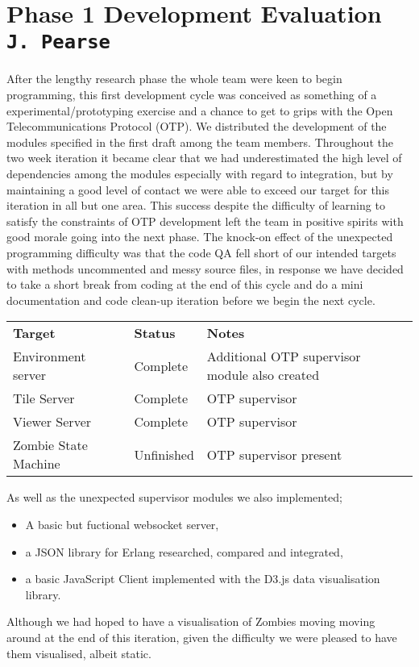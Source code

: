 \pagestyle{empty}
\section{Phase 1 Development Evaluation\\{\small\tt J.~Pearse}}
After the lengthy research phase the whole team were keen to begin programming, this first development cycle was conceived as something of a experimental/prototyping exercise and a chance to get to grips with the Open Telecommunications Protocol (OTP). We distributed the development of the modules specified in the first draft among the team members.
Throughout the two week iteration it became clear that we had underestimated the high level of dependencies among the modules especially with regard to integration, but by maintaining a good level of contact we were able to exceed our target for this iteration in all but one area. This success despite the difficulty of learning to satisfy the constraints of OTP development left the team in positive spirits with good morale going into the next phase.
The knock-on effect of the unexpected programming difficulty was that the code QA fell short of our intended targets with methods uncommented and messy source files, in response we have decided to take a short break from coding at the end of this cycle and do a mini documentation and code clean-up iteration before we begin the next cycle.\vspace{1 em}

\begin{tabular}{l|l|l}
\textbf{Target} & \textbf{Status} & \textbf{Notes} \\
Environment server & Complete & Additional OTP supervisor module also created \\
Tile Server & Complete & OTP supervisor \\
Viewer Server & Complete & OTP supervisor\\
Zombie State Machine & Unfinished & OTP supervisor present \\
\end{tabular}

\vspace{1 em}As well as the unexpected supervisor modules we also implemented;
\begin{itemize}
\item A basic but fuctional websocket server,
\item a JSON library for Erlang researched, compared and integrated,
\item a basic JavaScript Client implemented with the D3.js data visualisation library.
\end{itemize}
Although we had hoped to have a visualisation of Zombies moving moving around at the end of this iteration, given the difficulty we were pleased to have them visualised, albeit static. 
\clearpage
\endinput
